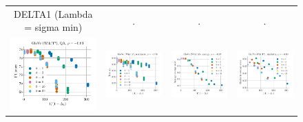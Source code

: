 \begin{figure}
\begin{tabular}{@{\hskip -0.0in}c@{\hskip -0.0in}c@{\hskip -0.0in}c@{\hskip -0.0in}c@{\hskip -0.0in}}
		DELTA1 (Lambda = sigma min) & . & . & . \\
		\includegraphics[width=.245\linewidth]{figures/glove-wiki400k-am_qa_best-f1_vs_gram-large-dim-delta1-2-trans_linx.pdf} &
		\includegraphics[width=.245\linewidth]{figures/glove-wiki400k-am_sentiment_trec_test-acc_vs_gram-large-dim-delta1-2-trans_linx.pdf} &
		\includegraphics[width=.245\linewidth]{figures/glove-wiki400k-am_intrinsics_analogy-avg-score_vs_gram-large-dim-delta1-2-trans_linx.pdf} &
		\includegraphics[width=.245\linewidth]{figures/glove-wiki400k-am_intrinsics_similarity-avg-score_vs_gram-large-dim-delta1-2-trans_linx.pdf} \\		
		

\end{tabular}
\end{figure}
